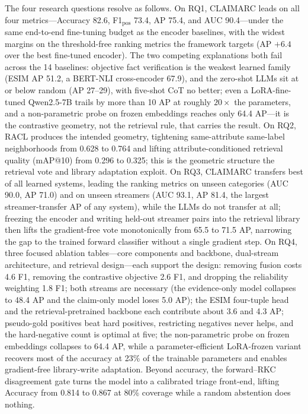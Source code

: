 \documentclass[11pt]{article}
\begin{document}
The four research questions resolve as follows. On RQ1, CLAIMARC leads on all
four metrics---Accuracy 82.6, F1$_{\text{pos}}$ 73.4, AP 75.4, and AUC
90.4---under the same end-to-end fine-tuning budget as the encoder baselines, with
the widest margins on the threshold-free ranking metrics the framework targets
(AP $+6.4$ over the best fine-tuned encoder). The two competing explanations both fail across
the 14 baselines: objective fact verification is the weakest learned family
(ESIM AP 51.2, a BERT-NLI cross-encoder 67.9), and the zero-shot LLMs sit at or
below random (AP 27--29), with five-shot CoT no better; even a LoRA-fine-tuned
Qwen2.5-7B trails by more than 10 AP at roughly $20\times$ the parameters, and a
non-parametric probe on frozen embeddings reaches only 64.4 AP---it is the
contrastive geometry, not the retrieval rule, that carries the result. On RQ2,
RACL produces the intended geometry, tightening same-attribute same-label
neighborhoods from 0.628 to 0.764 and lifting attribute-conditioned retrieval
quality (mAP@10) from 0.296 to 0.325; this is the geometric structure the
retrieval vote and library adaptation exploit. On RQ3, CLAIMARC transfers best of all learned systems, leading the
ranking metrics on unseen categories (AUC 90.0, AP 71.0) and on unseen streamers
(AUC 93.1, AP 81.4, the largest streamer-transfer AP of any system), while the
LLMs do not transfer at all; freezing the encoder and writing held-out streamer
pairs into the retrieval library then lifts the gradient-free vote monotonically
from 65.5 to 71.5 AP, narrowing the gap to the trained forward classifier without
a single gradient step. On RQ4, three focused ablation tables---core components
and backbone, dual-stream architecture, and retrieval design---each
support the design: removing fusion costs 4.6 F1, removing the contrastive
objective 2.6 F1, and dropping the reliability weighting 1.8 F1; both streams are
necessary (the evidence-only model collapses to 48.4 AP and the claim-only model
loses 5.0 AP); the ESIM four-tuple head and the retrieval-pretrained backbone each
contribute about 3.6 and 4.3 AP; pseudo-gold positives beat hard positives,
restricting negatives never helps, and the hard-negative count is optimal at five;
the non-parametric probe on frozen embeddings collapses to 64.4 AP, while a
parameter-efficient LoRA-frozen variant recovers most of the accuracy at 23\% of
the trainable parameters and enables gradient-free library-write adaptation.
Beyond accuracy, the forward--RKC disagreement gate turns the model into a
calibrated triage front-end, lifting Accuracy from 0.814 to 0.867 at 80\%
coverage while a random abstention does nothing.
\end{document}
